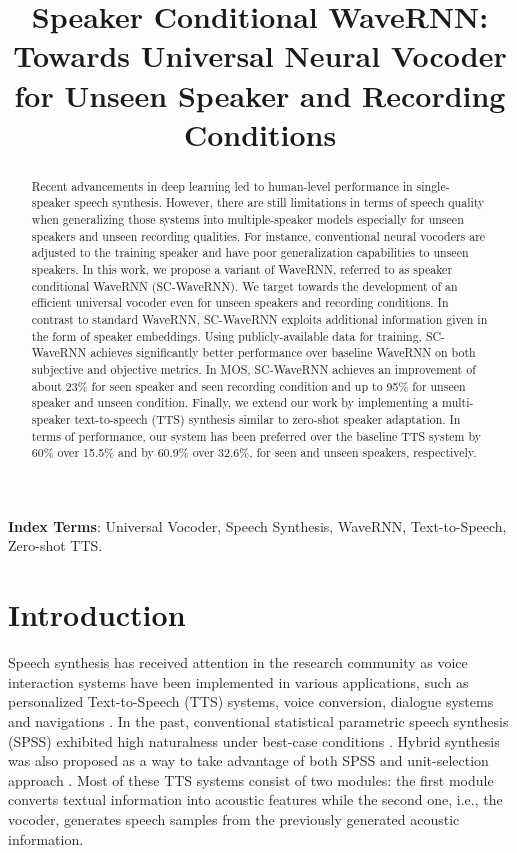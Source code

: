 \documentclass[a4paper]{article}
\title{Speaker Conditional WaveRNN: Towards Universal Neural Vocoder for Unseen Speaker and Recording Conditions}
\begin{document}
\maketitle
\vspace{-2mm}
\begin{abstract}
Recent advancements in deep learning led to human-level performance in single-speaker speech synthesis. However, there are still limitations in terms of speech quality when generalizing those systems into multiple-speaker models especially for unseen speakers and unseen recording qualities. For instance, conventional neural vocoders are adjusted to the training speaker and have poor generalization capabilities to unseen speakers. In this work, we propose a variant of WaveRNN, referred to as speaker conditional WaveRNN (SC-WaveRNN). We target towards the development of an efficient universal vocoder even for unseen speakers and recording conditions. In contrast to standard WaveRNN, SC-WaveRNN exploits additional information given in the form of speaker embeddings. Using publicly-available data for training, SC-WaveRNN achieves significantly better performance over baseline WaveRNN on both subjective and objective metrics. In MOS, SC-WaveRNN achieves an improvement of about 23\% for seen speaker and seen recording condition and up to 95\% for unseen speaker and unseen condition. Finally, we extend our work by implementing a multi-speaker text-to-speech (TTS) synthesis similar to zero-shot speaker adaptation.
In terms of performance, our system has been preferred over the baseline TTS system by 60\% over 15.5\% and by 60.9\% over 32.6\%, for seen and unseen speakers, respectively.
\end{abstract}
\noindent\textbf{Index Terms}: Universal Vocoder, Speech Synthesis, WaveRNN, Text-to-Speech, Zero-shot TTS.
\section{Introduction}

Speech synthesis has received attention in the research community as voice interaction systems have been implemented in various applications, such as personalized Text-to-Speech (TTS) systems, voice conversion, dialogue systems and navigations \cite{dutoit1997introduction, taylor2009text, stylianou1998continuous, paul2019non}.
In the past, conventional statistical parametric speech synthesis (SPSS) exhibited high naturalness under best-case conditions \cite{zen2009statistical, king2011introduction}. Hybrid synthesis was also proposed as a way to take advantage of both SPSS and unit-selection approach \cite{qian2012unified,merritt2016deep}. Most of these TTS systems consist of two modules: the first module converts textual information into acoustic features while the second one, i.e., the vocoder, generates speech samples from the previously generated acoustic information.
\end{document}
